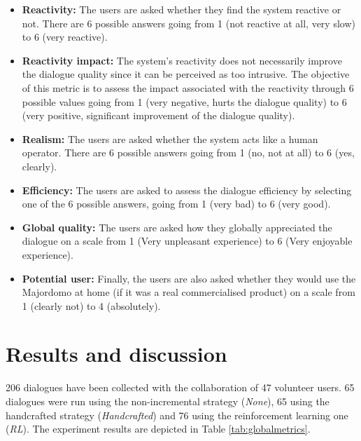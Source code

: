 		\begin{itemize}
			\item \textbf{Reactivity:} The users are asked whether they find the system reactive or not. There are 6 possible answers going from 1 (not reactive at all, very slow) to 6 (very reactive).
			\item \textbf{Reactivity impact:} The system's reactivity does not necessarily improve the dialogue quality since it can be perceived as too intrusive. The objective of this metric is to assess the impact associated with the reactivity through 6 possible values going from 1 (very negative, hurts the dialogue quality) to 6 (very positive, significant improvement of the dialogue quality).
			\item \textbf{Realism:} The users are asked whether the system acts like a human operator. There are 6 possible answers going from 1 (no, not at all) to 6 (yes, clearly).
			\item \textbf{Efficiency:} The users are asked to assess the dialogue efficiency by selecting one of the 6 possible answers, going from 1 (very bad) to 6 (very good).
			\item \textbf{Global quality:} The users are asked how they globally appreciated the dialogue on a scale from 1 (Very unpleasant experience) to 6 (Very enjoyable experience).
			\item \textbf{Potential user:} Finally, the users are also asked whether they would use the Majordomo at home (if it was a real commercialised product) on a scale from 1 (clearly not) to 4 (absolutely).
		\end{itemize}


\section{Results and discussion}

	206 dialogues have been collected with the collaboration of 47 volunteer users. 65 dialogues were run using the non-incremental strategy (\textit{None}), 65 using the handcrafted strategy (\textit{Handcrafted}) and 76 using the reinforcement learning one (\textit{RL}). The experiment results are depicted in Table \ref{tab:globalmetrics}.

